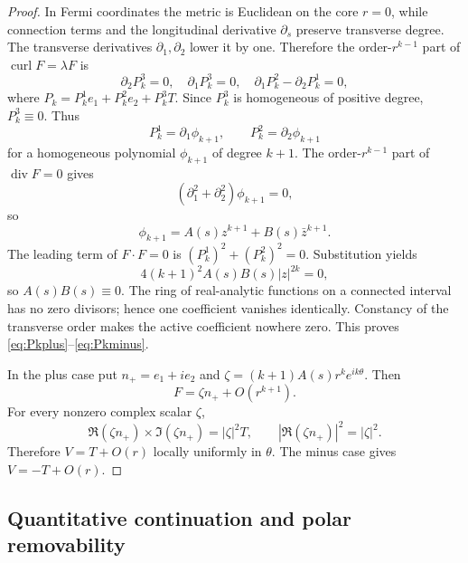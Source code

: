 \documentclass[aps,prd,reprint,nofootinbib,superscriptaddress]{revtex4-2}
\theoremstyle{definition}
\theoremstyle{remark}
\newcommand{\Div}{\operatorname{div}}
\newcommand{\Curl}{\operatorname{curl}}
\begin{document}
\begin{proof}
In Fermi coordinates the metric is Euclidean on the core $r=0$, while connection terms and the longitudinal derivative $\partial_s$ preserve transverse degree. The transverse derivatives $\partial_1,\partial_2$ lower it by one. Therefore the order-$r^{k-1}$ part of $\Curl F=\lambda F$ is
\begin{equation}
\partial_2P_k^3=0,
\quad
\partial_1P_k^3=0,
\quad
\partial_1P_k^2-\partial_2P_k^1=0,
\label{eq:transversecurl}
\end{equation}
where $P_k=P_k^1e_1+P_k^2e_2+P_k^3T$. Since $P_k^3$ is homogeneous of positive degree, $P_k^3\equiv0$. Thus
\begin{equation}
P_k^1=\partial_1\phi_{k+1},
\qquad
P_k^2=\partial_2\phi_{k+1}
\label{eq:transversepotential}
\end{equation}
for a homogeneous polynomial $\phi_{k+1}$ of degree $k+1$. The order-$r^{k-1}$ part of $\Div F=0$ gives
\[
(\partial_1^2+\partial_2^2)\phi_{k+1}=0,
\]
so
\begin{equation}
\phi_{k+1}=A(s)z^{k+1}+B(s)\bar z^{k+1}.
\label{eq:2Dharmonic}
\end{equation}
The leading term of $F\cdot F=0$ is $(P_k^1)^2+(P_k^2)^2=0$. Substitution yields
\begin{equation}
4(k+1)^2A(s)B(s)|z|^{2k}=0,
\label{eq:ABzero}
\end{equation}
so $A(s)B(s)\equiv0$. The ring of real-analytic functions on a connected interval has no zero divisors; hence one coefficient vanishes identically. Constancy of the transverse order makes the active coefficient nowhere zero. This proves \eqref{eq:Pkplus}--\eqref{eq:Pkminus}.

In the plus case put $n_+=e_1+ie_2$ and $\zeta=(k+1)A(s)r^ke^{ik\theta}$. Then
\begin{equation}
F=\zeta n_+ +O(r^{k+1}).
\label{eq:transverseFlead}
\end{equation}
For every nonzero complex scalar $\zeta$,
\begin{equation}
\Re(\zeta n_+)\times\Im(\zeta n_+)=|\zeta|^2T,
\qquad
|\Re(\zeta n_+)|^2=|\zeta|^2.
\label{eq:phasecancel}
\end{equation}
Therefore $V=T+O(r)$ locally uniformly in $\theta$. The minus case gives $V=-T+O(r)$.
\end{proof}

\subsection{Quantitative continuation and polar removability}
\end{document}
